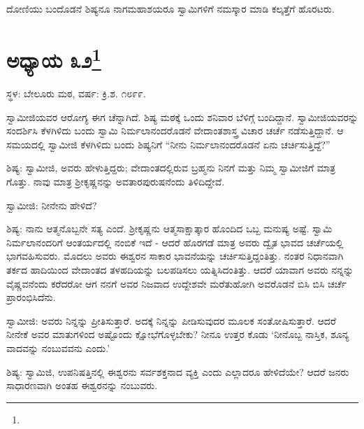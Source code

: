 ದೋಣಿಯು ಬಂದೊಡನೆ ಶಿಷ್ಯನೂ ನಾಗಮಹಾಶಯರೂ ಸ್ವಾಮಿಗಳಿಗೆ ನಮಸ್ಕಾರ ಮಾಡಿ ಕಲ್ಕತ್ತೆಗೆ ಹೊರಟರು.

\newpage

\chapter[ಅಧ್ಯಾಯ ೩೨]{ಅಧ್ಯಾಯ ೩೨\protect\footnote{}}

\begin{center}
ಸ್ಥಳ: ಬೇಲೂರು ಮಠ, ವರ್ಷ: ಕ್ರಿ.ಶ. ೧೮೯೯.
\end{center}

ಸ್ವಾಮೀಜಿಯವರ ಆರೋಗ್ಯ ಈಗ ಚೆನ್ನಾಗಿದೆ. ಶಿಷ್ಯ ಮಠಕ್ಕೆ ಒಂದು ಶನಿವಾರ ಬೆಳಿಗ್ಗೆ ಬಂದಿದ್ದಾನೆ. ಸ್ವಾಮೀಜಿಯವರನ್ನು ಸಂದರ್ಶಿಸಿ ಕೆಳಗಿಳಿದು ಬಂದು ಸ್ವಾಮಿ ನಿರ್ಮಲಾನಂದರೊಡನೆ ವೇದಾಂತಶಾಸ್ತ್ರ ವಿಚಾರ ಚರ್ಚೆ ನಡೆಸುತ್ತಿದ್ದಾನೆ. ಆ ಸಮಯದಲ್ಲಿ ಸ್ವಾಮೀಜಿ ಕೆಳಗಿಳಿದು ಬಂದು ಶಿಷ್ಯನಿಗೆ “ನೀನು ನಿರ್ಮಲಾನಂದರೊಡನೆ ಏನು ಚರ್ಚಿಸುತ್ತಿದ್ದೆ?”

ಶಿಷ್ಯ: ಸ್ವಾಮೀಜಿ, ಅವರು ಹೇಳುತ್ತಿದ್ದರು; ವೇದಾಂತದಲ್ಲಿರುವ ಬ್ರಹ್ಮನು ನಿನಗೆ ಮತ್ತು ನಿಮ್ಮ ಸ್ವಾಮೀಜಿಗೆ ಮಾತ್ರ ಗೊತ್ತು. ನಾವು ಮಾತ್ರ ಶ‍್ರೀಕೃಷ್ಣನನ್ನು ಅವತಾರಪುರುಷನೆಂದು ತಿಳಿದಿದ್ದೇವೆ.

ಸ್ವಾಮೀಜಿ: ನೀನೇನು ಹೇಳಿದೆ?

ಶಿಷ್ಯ: ನಾನು ಆತ್ಮನೊಬ್ಬನೇ ಸತ್ಯ ಎಂದೆ. ಶ‍್ರೀಕೃಷ್ಣನು ಆತ್ಮಸಾಕ್ಷಾತ್ಕಾರ ಹೊಂದಿದ ಒಬ್ಬ ಮನುಷ್ಯ ಅಷ್ಟೆ. ಸ್ವಾಮಿ ನಿರ್ಮಲಾನಂದರಿಗೆ ಆಂತರ್ಯದಲ್ಲಿ ನಂಬಿಕೆ ಇದೆ - ಆದರೆ ಹೊರಗಡೆ ಮಾತ್ರ ಅವರು ದ್ವೈತ ಭಾವದ ಚರ್ಚೆಯಲ್ಲಿ ಭಾಗವಹಿಸುವರು. ಮೊದಲು ಅವರು ಈಶ್ವರನ ಸಾಕಾರ ಭಾವನೆಯನ್ನು ಚರ್ಚಿಸುತ್ತಿದ್ದಂತಿತ್ತು. ನಂತರ ನಿಧಾನವಾಗಿ ತರ್ಕದ ಹಾದಿಯಿಂದ ವೇದಾಂತದ ತಳಹದಿಯನ್ನು ಬಲಪಡಿಸಲು ಯತ್ನಿಸಿದಂತಿತ್ತು. ಆದರೆ ಯಾವಾಗ ಅವರು ನನ್ನನ್ನು ವೈಷ್ಣವನೆಂದು ಕರೆದರೋ ಆಗ ನನಗೆ ಅವರ ನಿಜವಾದ ಉದ್ದೇಶವೇ ಮರೆತುಹೋಗಿ ಅವರೊಡನೆ ಬಿಸಿ ಬಿಸಿ ಚರ್ಚೆ ಪ್ರಾರಂಭಿಸಿದೆನು.

ಸ್ವಾಮೀಜಿ: ಅವರು ನಿನ್ನನ್ನು ಪ್ರೀತಿಸುತ್ತಾರೆ. ಅದಕ್ಕೆ ನಿನ್ನನ್ನು ಪೀಡಿಸುವುದರ ಮೂಲಕ ಸಂತೋಷಿಸುತ್ತಾರೆ. ಆದರೆ ನೀನೇಕೆ ಅವರ ಮಾತುಗಳಿಂದ ಅಷ್ಟೊಂದು ಕ್ಷೋಭೆಗೊಳ್ಳಬೇಕು? ನೀನೂ ಉತ್ತರ ಕೊಡು ‘ನೀನೊಬ್ಬ ನಾಸ್ತಿಕ, ಶೂನ್ಯ ವಾದವನ್ನು ನಂಬುವವನು ಎಂದು.’

ಶಿಷ್ಯ: ಸ್ವಾಮಿಜಿ, ಉಪನಿಷತ್ತಿನಲ್ಲಿ ಈಶ್ವರನು ಸರ್ವಶಕ್ತನಾದ ವ್ಯಕ್ತಿ ಎಂದು ಎಲ್ಲಾದರೂ ಹೇಳಿದೆಯೇ? ಆದರೆ ಜನರು ಸಾಧಾರಣವಾಗಿ ಅಂತಹ ಈಶ್ವರನನ್ನು ನಂಬುವರು.

